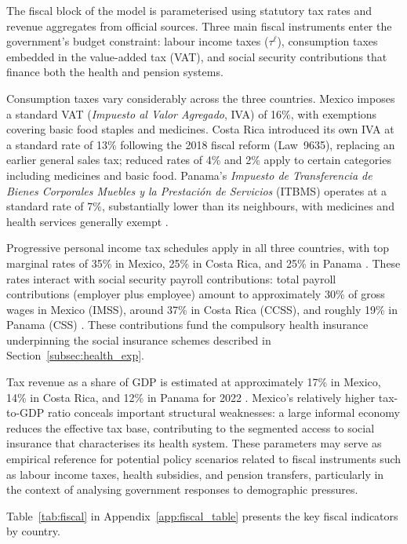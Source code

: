 \documentclass[12pt,a4paper]{article}
\begin{document}
The fiscal block of the model is parameterised using statutory tax
rates and revenue aggregates from official sources. Three main fiscal
instruments enter the government's budget constraint: labour income
taxes ($\tau^{\ell}$), consumption taxes embedded in the value-added
tax (VAT), and social security contributions that finance both the
health and pension systems.

Consumption taxes vary considerably across the three countries. Mexico
imposes a standard VAT (\textit{Impuesto al Valor Agregado}, IVA) of
16\%, with exemptions covering basic food staples and medicines. Costa
Rica introduced its own IVA at a standard rate of 13\% following the
2018 fiscal reform (Law~9635), replacing an earlier general sales tax;
reduced rates of 4\% and 2\% apply to certain categories including
medicines and basic food. Panama's \textit{Impuesto de Transferencia de
Bienes Corporales Muebles y la Prestaci\'{o}n de Servicios} (ITBMS)
operates at a standard rate of 7\%, substantially lower than its
neighbours, with medicines and health services generally exempt
\citep{PwCWWTS2024}.

Progressive personal income tax schedules apply in all three countries,
with top marginal rates of 35\% in Mexico, 25\% in Costa Rica, and
25\% in Panama \citep{PwCWWTS2024}. These rates interact with social
security payroll contributions: total payroll contributions (employer
plus employee) amount to approximately 30\% of gross wages in Mexico
(IMSS), around 37\% in Costa Rica (CCSS), and roughly 19\% in Panama
(CSS) \citep{CCSS2023, PwCWWTS2024}. These contributions fund the
compulsory health insurance underpinning the social insurance schemes
described in Section~\ref{subsec:health_exp}.

Tax revenue as a share of GDP is estimated at approximately 17\% in
Mexico, 14\% in Costa Rica, and 12\% in Panama for 2022
\citep{OECDRevStats2024, WorldBankWDI2024}. Mexico's relatively higher
tax-to-GDP ratio conceals important structural weaknesses: a large
informal economy reduces the effective tax base, contributing to the
segmented access to social insurance that characterises its health
system. These parameters may serve as empirical reference for potential policy scenarios related to fiscal instruments such as labour income taxes, health subsidies, and pension transfers, particularly in the context of analysing government responses to demographic pressures.

Table~\ref{tab:fiscal} in Appendix~\ref{app:fiscal_table} presents the key fiscal indicators by country.
\end{document}
